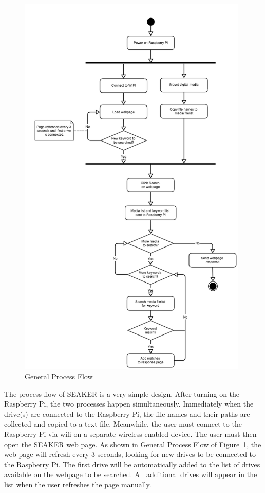 \documentclass[12pt]{article}
\begin{document}
\begin{figure}[H]
  \begin{center}
  \includegraphics[width=11cm]{images/ProcessFlow.png}
  \caption{General Process Flow}
  \label{fig:ProcessFlow}
  \end{center}
\end{figure}

The process flow of SEAKER is a very simple design. After turning on
the Raspberry Pi, the two processes happen simultaneously. Immediately
when the drive(s) are connected to the Raspberry Pi, the file names
and their paths are collected and copied to a text file. Meanwhile,
the user must connect to the Raspberry Pi via \gls{wifi} on a separate
wireless-enabled device. The user must then open the SEAKER web page.
As shown in General Process Flow of Figure~\ref{fig:ProcessFlow},
the web page will refresh every 3 seconds, looking for new drives to
be connected to the Raspberry Pi. The first drive will be automatically added
to the list of drives available on the webpage to be searched. All
additional drives will appear in the list when the user refreshes
the page manually.\\
\end{document}

